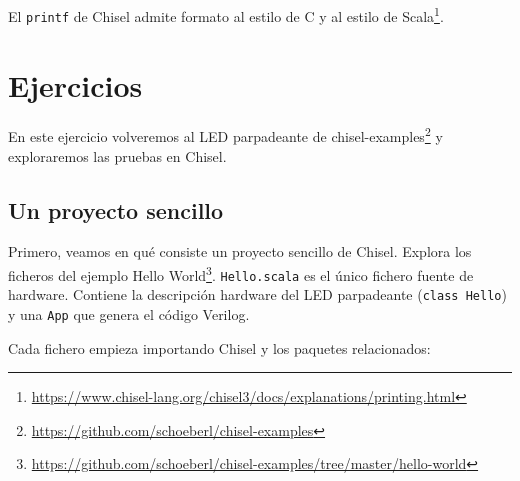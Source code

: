 \documentclass[%
    10pt,
    headinclude, footinclude=false,
    openright, %
    notitlepage,
    cleardoublepage=empty,
    headsepline,
    numbers=noenddot,
    bibliography=totoc, index=totoc,
    ]{scrbook}
\newcommand{\code}[1]{{\lstinline[basicstyle=\small\ttfamily]{#1}}}
\newcommand{\myref}[2]{\href{#1}{#2}}
\renewcommand{\myref}[2]{{#2}{\footnote{\url{#1}}}}
\begin{document}

El \code{printf} de Chisel admite
\myref{https://www.chisel-lang.org/chisel3/docs/explanations/printing.html}{formato al estilo de C y al
estilo de Scala}.


\section{Ejercicios}


En este ejercicio volveremos al LED parpadeante de
\myref{https://github.com/schoeberl/chisel-examples}{chisel-examples}
y exploraremos las pruebas en Chisel.

\subsection{Un proyecto sencillo}


Primero, veamos en qué consiste un proyecto sencillo de Chisel. Explora los ficheros del ejemplo
\myref{https://github.com/schoeberl/chisel-examples/tree/master/hello-world}{Hello World}.
\code{Hello.scala} es el único fichero fuente de hardware.
Contiene la descripción hardware del LED parpadeante (\code{class Hello})
y una \code{App} que genera el código Verilog.


Cada fichero empieza importando Chisel y los paquetes relacionados:


\end{document}
